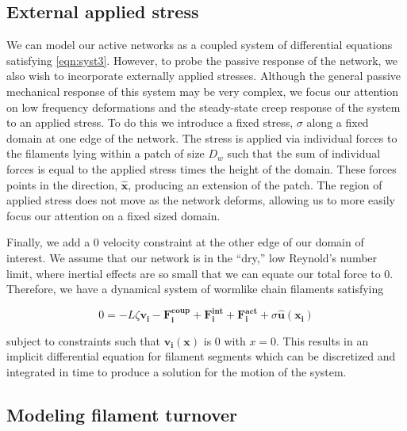 \documentclass[10pt,letterpaper]{article}
\begin{document}
\subsection*{External applied stress}
We can model our active networks as a coupled system of differential equations satisfying \ref{eqn:syst3}.  However, to probe the passive response of the network, we also wish to incorporate externally applied stresses.  Although the general passive mechanical response of this system may be very complex, we focus our attention on low frequency deformations and the steady-state creep response of the system to an applied stress.  To do this we introduce a fixed stress, $\sigma$ along a fixed domain at one edge of the network.  The stress is applied via individual forces to the filaments lying within a patch of size $D_w$ such that the sum of individual forces is equal to the applied stress times the height of the domain.  These forces points in the direction, $\mathbf{\hat{x}}$, producing an extension of the patch.  The region of applied stress does not move as the network deforms, allowing us to more easily focus our attention on a fixed sized domain. 

Finally, we add a 0 velocity constraint at the other edge of our domain of interest.  We assume that our network is in the ``dry,'' low Reynold's number limit, where inertial effects are so small that we can equate our total force to 0.  Therefore, we have a dynamical system of wormlike chain filaments satisfying

\begin{equation}
\label{eqn:systfull}
0=-L\zeta\mathbf{ v_i} -\mathbf{F^{coup}_i}+ \mathbf{F^{int}_i}+\mathbf{F^{act}_i} + \sigma\mathbf{\hat{u}(x_i)}
\end{equation}

subject to constraints such that $\mathbf{v_i(x)}$ is 0 with $x=0$.  This results in an implicit differential equation for filament segments which can be discretized and integrated in time to produce a solution for the motion of the system.


\subsection*{Modeling filament turnover}
\end{document}
